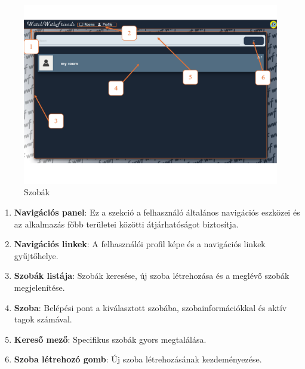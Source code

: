 \begin{figure}[H]
    \centering
    \includegraphics[width=14.0truecm]{images/lobby.pdf}
    \caption{Szobák}
    \label{fig:login}
\end{figure}
\begin{enumerate}
  \item \textbf{Navigációs panel}: Ez a szekció a felhasználó általános navigációs eszközei és az alkalmazás főbb területei közötti átjárhatóságot biztosítja.
\item \textbf{Navigációs linkek}: A felhasználói profil képe és a navigációs linkek gyűjtőhelye.
\item \textbf{Szobák listája}: Szobák keresése, új szoba létrehozása és a meglévő szobák megjelenítése.
\item \textbf{Szoba}: Belépési pont a kiválasztott szobába, szobainformációkkal és aktív tagok számával.
\item \textbf{Kereső mező}: Specifikus szobák gyors megtalálása.
\item \textbf{Szoba létrehozó gomb}: Új szoba létrehozásának kezdeményezése.
\end{enumerate}
